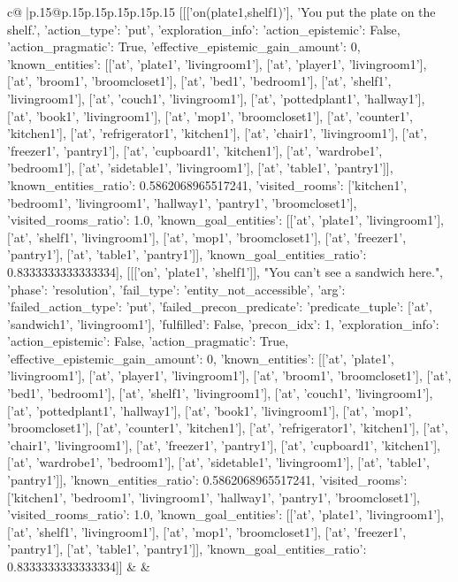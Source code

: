 \documentclass{article}
\begin{document}
{\begin{supertabular}{c@{$\;$}|p{.15\linewidth}@{}p{.15\linewidth}p{.15\linewidth}p{.15\linewidth}p{.15\linewidth}p{.15\linewidth}}
{{{	 [[['on(plate1,shelf1)'], 'You put the plate on the shelf.', {'action_type': 'put', 'exploration_info': {'action_epistemic': False, 'action_pragmatic': True, 'effective_epistemic_gain_amount': 0, 'known_entities': [['at', 'plate1', 'livingroom1'], ['at', 'player1', 'livingroom1'], ['at', 'broom1', 'broomcloset1'], ['at', 'bed1', 'bedroom1'], ['at', 'shelf1', 'livingroom1'], ['at', 'couch1', 'livingroom1'], ['at', 'pottedplant1', 'hallway1'], ['at', 'book1', 'livingroom1'], ['at', 'mop1', 'broomcloset1'], ['at', 'counter1', 'kitchen1'], ['at', 'refrigerator1', 'kitchen1'], ['at', 'chair1', 'livingroom1'], ['at', 'freezer1', 'pantry1'], ['at', 'cupboard1', 'kitchen1'], ['at', 'wardrobe1', 'bedroom1'], ['at', 'sidetable1', 'livingroom1'], ['at', 'table1', 'pantry1']], 'known_entities_ratio': 0.5862068965517241, 'visited_rooms': ['kitchen1', 'bedroom1', 'livingroom1', 'hallway1', 'pantry1', 'broomcloset1'], 'visited_rooms_ratio': 1.0, 'known_goal_entities': [['at', 'plate1', 'livingroom1'], ['at', 'shelf1', 'livingroom1'], ['at', 'mop1', 'broomcloset1'], ['at', 'freezer1', 'pantry1'], ['at', 'table1', 'pantry1']], 'known_goal_entities_ratio': 0.8333333333333334}}], [[['on', 'plate1', 'shelf1']], "You can't see a sandwich here.", {'phase': 'resolution', 'fail_type': 'entity_not_accessible', 'arg': {'failed_action_type': 'put', 'failed_precon_predicate': {'predicate_tuple': ['at', 'sandwich1', 'livingroom1'], 'fulfilled': False, 'precon_idx': 1}}, 'exploration_info': {'action_epistemic': False, 'action_pragmatic': True, 'effective_epistemic_gain_amount': 0, 'known_entities': [['at', 'plate1', 'livingroom1'], ['at', 'player1', 'livingroom1'], ['at', 'broom1', 'broomcloset1'], ['at', 'bed1', 'bedroom1'], ['at', 'shelf1', 'livingroom1'], ['at', 'couch1', 'livingroom1'], ['at', 'pottedplant1', 'hallway1'], ['at', 'book1', 'livingroom1'], ['at', 'mop1', 'broomcloset1'], ['at', 'counter1', 'kitchen1'], ['at', 'refrigerator1', 'kitchen1'], ['at', 'chair1', 'livingroom1'], ['at', 'freezer1', 'pantry1'], ['at', 'cupboard1', 'kitchen1'], ['at', 'wardrobe1', 'bedroom1'], ['at', 'sidetable1', 'livingroom1'], ['at', 'table1', 'pantry1']], 'known_entities_ratio': 0.5862068965517241, 'visited_rooms': ['kitchen1', 'bedroom1', 'livingroom1', 'hallway1', 'pantry1', 'broomcloset1'], 'visited_rooms_ratio': 1.0, 'known_goal_entities': [['at', 'plate1', 'livingroom1'], ['at', 'shelf1', 'livingroom1'], ['at', 'mop1', 'broomcloset1'], ['at', 'freezer1', 'pantry1'], ['at', 'table1', 'pantry1']], 'known_goal_entities_ratio': 0.8333333333333334}}]] 
	  } 
	   } 
	   } 
	 & & \\ 
 


\end{supertabular}}
\end{document}
